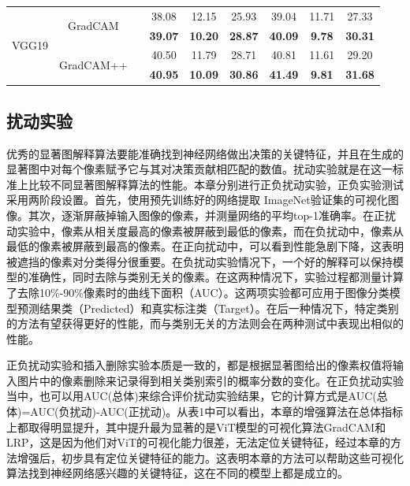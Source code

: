 \begin{table}
{\begin{tabular}{ccccccccc}
			\hline
			\multirow{4}{*}{VGG19} & \multirow{2}{*}{GradCAM}                 &                       & 38.08          & 12.15          & 25.93          & 39.04          & 11.71          & 27.33           \\ 
			\cline{4-9}
			&                                          & \checkmark                     & \textbf{39.07} & \textbf{10.20} & \textbf{28.87} & \textbf{40.09} & \textbf{9.78}  & \textbf{30.31}  \\ 
			\cline{2-9}
			& \multirow{2}{*}{GradCAM++}               &                       & 40.50          & 11.79          & 28.71          & 40.81          & 11.61          & 29.20           \\ 
			\cline{4-9}
			&                                          & \checkmark                     & \textbf{40.95} & \textbf{10.09} & \textbf{30.86} & \textbf{41.49} & \textbf{9.81}  & \textbf{31.68}  \\
			\hline
		\end{tabular}
	}
\end{table}
\subsection{扰动实验}
优秀的显著图解释算法要能准确找到神经网络做出决策的关键特征，并且在生成的显著图中对每个像素赋予它与其对决策贡献相匹配的数值。扰动实验就是在这一标准上比较不同显著图解释算法的性能。本章分别进行正负扰动实验，正负实验测试采用两阶段设置。首先，使用预先训练好的网络提取 ImageNet验证集的可视化图像。其次，逐渐屏蔽掉输入图像的像素，并测量网络的平均top-1准确率。在正扰动实验中，像素从相关度最高的像素被屏蔽到最低的像素，而在负扰动中，像素从最低的像素被屏蔽到最高的像素。在正向扰动中，可以看到性能急剧下降，这表明被遮挡的像素对分类得分很重要。在负扰动实验情况下，一个好的解释可以保持模型的准确性，同时去除与类别无关的像素。在这两种情况下，实验过程都测量计算了去除10\%-90\%像素时的曲线下面积（AUC）。这两项实验都可应用于图像分类模型预测结果类（Predicted）和真实标注类（Target）。在后一种情况下，特定类别的方法有望获得更好的性能，而与类别无关的方法则会在两种测试中表现出相似的性能。

正负扰动实验和插入删除实验本质是一致的，都是根据显著图给出的像素权值将输入图片中的像素删除来记录得到相关类别索引的概率分数的变化。在正负扰动实验当中，也可以用AUC(总体)来综合评价扰动实验结果，它的计算方式是AUC(总体)=AUC(负扰动)-AUC(正扰动)。从表1中可以看出，本章的增强算法在总体指标上都取得明显提升，其中提升最为显著的是ViT模型的可视化算法GradCAM和LRP，这是因为他们对ViT的可视化能力很差，无法定位关键特征，经过本章的方法增强后，初步具有定位关键特征的能力。这表明本章的方法可以帮助这些可视化算法找到神经网络感兴趣的关键特征，这在不同的模型上都是成立的。

